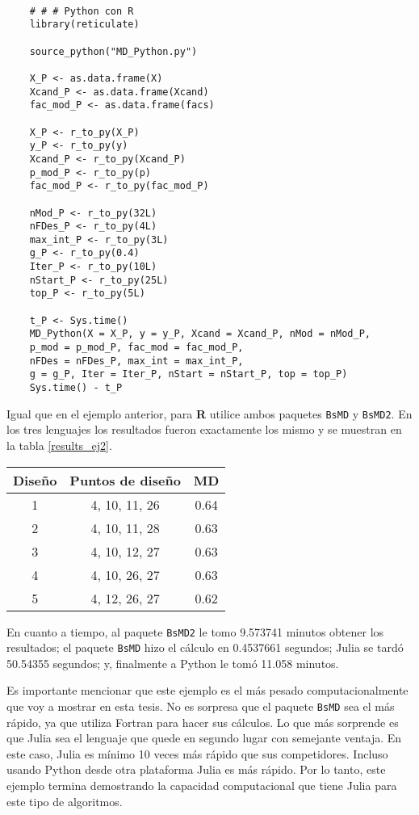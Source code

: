 \begin{verbatim}
	
	# # # Python con R
	library(reticulate)
	
	source_python("MD_Python.py")
	
	X_P <- as.data.frame(X)
	Xcand_P <- as.data.frame(Xcand)
	fac_mod_P <- as.data.frame(facs)
	
	X_P <- r_to_py(X_P)
	y_P <- r_to_py(y) 
	Xcand_P <- r_to_py(Xcand_P)
	p_mod_P <- r_to_py(p)
	fac_mod_P <- r_to_py(fac_mod_P)
	
	nMod_P <- r_to_py(32L)
	nFDes_P <- r_to_py(4L)
	max_int_P <- r_to_py(3L)
	g_P <- r_to_py(0.4)
	Iter_P <- r_to_py(10L)
	nStart_P <- r_to_py(25L)
	top_P <- r_to_py(5L)
	
	t_P <- Sys.time()
	MD_Python(X = X_P, y = y_P, Xcand = Xcand_P, nMod = nMod_P, 
	p_mod = p_mod_P, fac_mod = fac_mod_P, 
	nFDes = nFDes_P, max_int = max_int_P, 
	g = g_P, Iter = Iter_P, nStart = nStart_P, top = top_P)
	Sys.time() - t_P
\end{verbatim} 

Igual que en el ejemplo anterior, para \textbf{R} utilice ambos paquetes \texttt{BsMD} y \texttt{BsMD2}. En los tres lenguajes los resultados fueron exactamente los mismo y se muestran en la tabla \ref{results_ej2}.

\begin{center}
	\begin{tabular}{cc|c}
		Diseño & Puntos de diseño & MD \\
		\hline
		1 & 4, 10, 11, 26 & 0.64 \\
		
		2 & 4, 10, 11, 28 & 0.63 \\
		
		3 & 4, 10, 12, 27 & 0.63 \\
		
		4 & 4, 10, 26, 27 & 0.63 \\
		
		5 & 4, 12, 26, 27 & 0.62 \\
		
	\end{tabular}
	 \label{results_ej2}
\end{center}

En cuanto a tiempo, al paquete \texttt{BsMD2} le tomo 9.573741 minutos obtener los resultados; el paquete \texttt{BsMD} hizo el cálculo en 0.4537661 segundos; Julia se tardó 50.54355 segundos; y, finalmente a Python le tomó 11.058 minutos.

Es importante mencionar que este ejemplo es el más pesado computacionalmente que voy a mostrar en esta tesis. No es sorpresa que el paquete \texttt{BsMD} sea el más rápido, ya que utiliza Fortran para hacer sus cálculos. Lo que más sorprende es que Julia sea el lenguaje que quede en segundo lugar con semejante ventaja. En este caso, Julia es mínimo 10 veces más rápido que sus competidores. Incluso usando Python desde otra plataforma Julia es más rápido. Por lo tanto, este ejemplo termina demostrando la capacidad computacional que tiene Julia para este tipo de algoritmos. 







 


